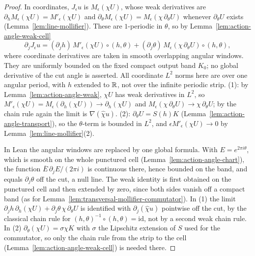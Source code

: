 \begin{proof}
\leanok
In coordinates, $J_\epsilon u$ is $M_\epsilon(\chi U)$, whose weak derivatives are
$\partial_hM_\epsilon(\chi U)=M'_\epsilon(\chi U)$ and $\partial_\theta M_\epsilon(\chi U)=M_\epsilon(\chi\,\partial_\theta U)$
whenever $\partial_\theta U$ exists (Lemma~\ref{lem:line-mollifier}). These are $1$-periodic in $\theta$, so
by Lemma~\ref{lem:action-angle-weak-cell}
\[
  \partial_jJ_\epsilon u=(\partial_jh)\,M'_\epsilon(\chi U)\circ(h,\theta)
    +(\partial_j\theta)\,M_\epsilon(\chi\,\partial_\theta U)\circ(h,\theta),
\]
where coordinate derivatives are taken in smooth overlapping angular
windows. They are uniformly bounded on the fixed compact output band
$K_0$; no global derivative of the cut angle is asserted. All coordinate
$L^2$ norms here are over one angular period, with $h$ extended to $\mathbb{R}$,
not over the infinite periodic strip. (1): by
Lemma~\ref{lem:action-angle-weak}, $\chi U$ has weak derivatives in $L^2$, so
$M'_\epsilon(\chi U)=M_\epsilon(\partial_h(\chi U))\to\partial_h(\chi U)$ and
$M_\epsilon(\chi\,\partial_\theta U)\to\chi\,\partial_\theta U$; by the chain rule again the limit is
$\nabla(\hat\chi u)$. (2): $\partial_\theta U=S(h)K$ (Lemma~\ref{lem:action-angle-transport}), so the
$\theta$-term is bounded in $L^2$, and $\epsilon M'_\epsilon(\chi U)\to0$ by
Lemma~\ref{lem:line-mollifier}(2).

In Lean the angular windows are replaced by one global formula. With $E=e^{2\pi i\theta}$,
which is smooth on the whole punctured cell (Lemma~\ref{lem:action-angle-chart}), the
function $\overline E\,\partial_jE/(2\pi i)$ is continuous there, hence bounded on the
band, and equals $\partial_j\theta$ off the cut, a null line. The weak identity is first
obtained on the punctured cell and then extended by zero, since both sides vanish off a
compact band (as for Lemma~\ref{lem:transversal-mollifier-commutator}). In (1) the limit
$\partial_jh\,\partial_h(\chi U)+\partial_j\theta\,\chi\,\partial_\theta U$ is identified
with $\partial_j(\hat\chi u)$ pointwise off the cut, by the classical chain rule for
$(h,\theta)^{-1}\circ(h,\theta)=\mathrm{id}$, not by a second weak chain rule. In (2)
$\partial_\theta(\chi U)=\sigma\chi K$ with $\sigma$ the Lipschitz extension of $S$ used for the
commutator, so only the chain rule from the strip to the cell
(Lemma~\ref{lem:action-angle-weak-cell}) is needed there.
\end{proof}

